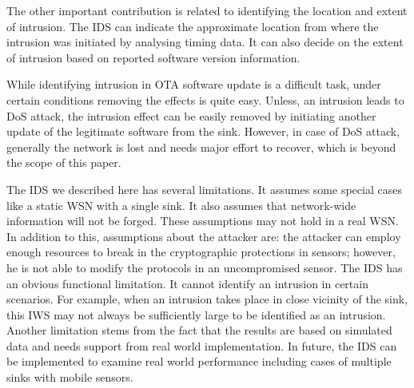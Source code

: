 \documentclass[conference,final]{IEEEtran}
\begin{document}
The other important contribution is related to identifying the location and extent of intrusion.
The IDS can indicate the approximate location from where the intrusion was initiated by analysing timing data.
It can also decide on the extent of intrusion based on reported software version information.

While identifying intrusion in OTA software update is a difficult task, under certain conditions removing the effects is quite easy.
Unless, an intrusion leads to DoS attack, the intrusion effect can be easily removed by initiating another update of the legitimate software from the sink.
However, in case of DoS attack, generally the network is lost and needs major effort to recover, which is beyond the scope of this paper.

The IDS we described here has several limitations. 
It assumes some special cases like a static WSN with a single sink.
It also assumes that network-wide information will not be forged. %
These assumptions may not hold in a real WSN.
In addition to this, assumptions about the attacker are: the attacker can employ enough resources to break in the cryptographic protections in sensors; however, he is not able to modify the protocols in an uncompromised sensor.
The IDS has an obvious functional limitation.
It cannot identify an intrusion in certain scenarios.
For example, when an intrusion takes place in close vicinity of the sink, this IWS may not always be sufficiently large to be identified as an intrusion.
Another limitation stems from the fact that the results are based on simulated data and needs support from real world implementation.
In future,  the IDS can be implemented to examine real world performance including cases of multiple sinks with mobile sensors.






\end{document}
